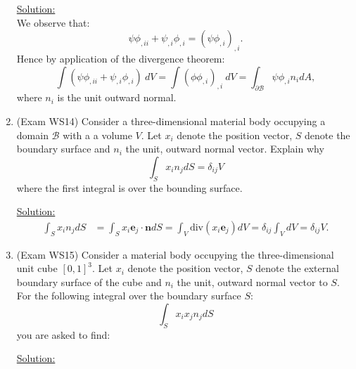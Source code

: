 \documentclass{article}
\newcommand{\ee}{\end{equation}}
\newcommand{\be}{\begin{equation}}
\newcommand{\pa}{\partial}
\newcommand{\bs}{\boldsymbol}
\begin{document}
\begin{enumerate}
\underline{Solution:} \\
We observe that:
\be
\psi \phi_{,ii}+\psi_{,i}\phi_{,i}=(\psi \phi_{,i})_{,i}.
\ee
Hence by application of the divergence theorem:
\be
\int( \psi \phi_{,ii}+\psi_{,i}\phi_{,i})~dV=\int(\phi \phi_{,i})_{,i} ~dV= \int_{\pa \mathcal{B}} \psi \phi_{,i} n_i dA,
\ee
where $n_i$ is the unit outward normal.

\item (Exam WS14) Consider a three-dimensional material body occupying a domain $\mathcal{B}$ with a  a volume $V$. Let  $x_i$ denote the position vector,  $S$ denote the boundary surface and $n_i$ the unit,  outward
normal vector. Explain why
\be
\int_S x_i n_j dS=\delta_{ij} V
\ee
where the first integral is over the bounding surface.

\underline{Solution:}
\begin{align}
\int_S x_i n_j dS &= \int_S x_i \bs e_j \cdot \bs n dS = \int_V \textrm{div}(x_i \bs e_j) dV = \delta_{ij} \int_V dV = \delta_{ij} V.
\end{align}

\item (Exam WS15) Consider a material body occupying the three-dimensional unit cube $[0, 1]^3$.
Let $x_i$ denote the position vector, $S$ denote the external boundary surface of the cube and $n_i$
the unit, outward normal vector to $S$. For the following integral over the boundary surface
$S$:
\be
\int_S x_i x_j n_j dS
\ee
you are asked to find:

\underline{Solution:}



\end{enumerate}
\end{document}
